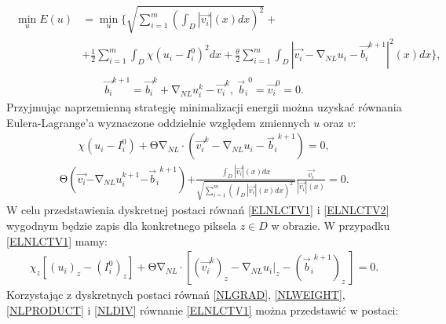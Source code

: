 \documentclass[12pt, twoside, openany]{report}
\theoremstyle{definition}
\begin{document}
\begin{align}
\begin{aligned}
\mathop{\mathrm{min}}_{u}E\left(u\right) &= \mathop{\mathrm{min}}_{u}\Biggl\{\sqrt{\sum^m_{i=1}{{\left(\int_D{\left|\overrightarrow{v_i}\right|(x)}dx\right)}^2}}+\\ 
&+\frac{1}{2}\sum^m_{i=1}{\int_D{ \chi {\left(u_i-I^0_i\right)}^2}dx} 
+\frac{\theta }{2}\sum^m_{i=1}{\int_D{{\left|\overrightarrow{v_i}-{\mathrm{\nabla }}_{NL}u_i- {\overrightarrow{b_i}}^{k+1}\right|}^2\left(x\right)}dx}\Biggr\},
\end{aligned}
\label{ENLCTV1}
\end{align}
\begin{align}
{\overrightarrow{b_i}}^{k+1}={\overrightarrow{b_i}}^k+{\mathrm{\nabla }}_{NL}u^k_i-{\overrightarrow{v_i}}^k,\ {{\overrightarrow{b}}_i}^0={\overrightarrow{v_i}}^0=0.
\label{ENLCTV2}
\end{align}
Przyjmując naprzemienną strategię minimalizacji energii można uzyskać równania Eulera-Lagrange’a wyznaczone oddzielnie względem zmiennych $u$ oraz $v$:
\begin{align}
\chi \left(u_i-I^0_i\right)+\mathrm{\Theta }{\mathrm{\nabla }}_{NL}\cdot \left({\overrightarrow{v_i}}^k-{\mathrm{\nabla }}_{NL}u_i-{{\overrightarrow{b}}_i}^{k+1}\right)=0,
\label{ELNLCTV1}
\end{align}
\begin{align}
\mathrm{\Theta }\left(\overrightarrow{v_i}\mathrm{-}{\mathrm{\nabla }}_{NL}u^{k+1}_i\mathrm{-}{{\overrightarrow{b}}_i}^{k+1}\right)\mathrm{+}\frac{\int_D{\left|\overrightarrow{v_i}\right|(x)}dx}{\sqrt{\sum^m_{i=1}{{\left(\int_D{\left|\overrightarrow{v_i}\right|(x)}dx\right)}^2}\ }}\frac{\overrightarrow{v_i}}{\left|\overrightarrow{v_i}\right|(x)}\mathrm{=0}.
\label{ELNLCTV2}
\end{align}
W celu przedstawienia dyskretnej postaci równań \eqref{ELNLCTV1} i \eqref{ELNLCTV2} wygodnym będzie zapis dla konkretnego piksela $z\in D$ w obrazie. W przypadku \eqref{ELNLCTV1} mamy: 
\begin{align}
\chi_z \left[{(u_i)}_z-{\left(I^0_i\right)}_z \right]+\mathrm{\Theta}{\mathrm{\nabla}}_{NL}\cdot \left[ \left({{\overrightarrow{v_i}}^k}\right)_z-{{\mathrm{\nabla}}_{NL}u_i}\big|_z-{\left({{\overrightarrow{b}}_i}^{k+1}\right)}_z \ \right]=0 .
\label{DELNLCTV1}
\end{align}
Korzystając z dyskretnych postaci równań \eqref{NLGRAD}, \eqref{NLWEIGHT}, \eqref{NLPRODUCT} i \eqref{NLDIV} równanie \eqref{ELNLCTV1} można przedstawić w postaci:
\end{document}
